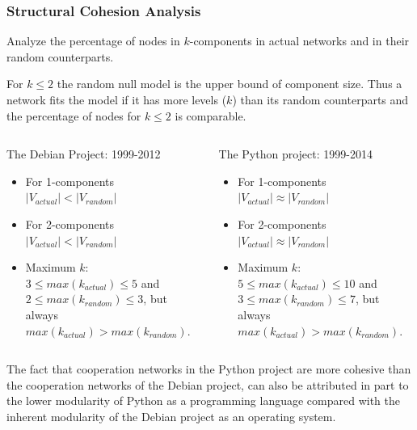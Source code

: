 \documentclass[ignorenonframetext,red,8pt,notes=hide]{beamer}
\begin{document}
\begin{frame}
\frametitle{Structural Cohesion Analysis}

Analyze the percentage of nodes in $k$-components in actual networks and in their random counterparts.

For $k \leq 2$ the random null model is the upper bound of component size. Thus a network fits the model if it has more levels ($k$) than its random counterparts and the percentage of nodes for $k \leq 2$ is comparable. 

\pause

\begin{columns}[c]
\begin{column}{0.5\textwidth}
\begin{block}{The Debian Project: 1999-2012}
\begin{itemize}
\item For 1-components $|V_{actual}| < |V_{random}|$
\item For 2-components $|V_{actual}| < |V_{random}|$
\item Maximum $k$:\\ $3 \leq max(k_{actual}) \leq 5$ and\\ $2 \leq  max(k_{random}) \leq 3$, but always \\ $max(k_{actual}) > max(k_{random})$. 
\end{itemize}
\end{block}
\end{column}

\begin{column}{0.5\textwidth}
\begin{block}{The Python project: 1999-2014}
\begin{itemize}
\item For 1-components $|V_{actual}| \approx |V_{random}|$
\item For 2-components $|V_{actual}| \approx |V_{random}|$
\item Maximum $k$:\\ $5 \leq max(k_{actual}) \leq 10$ and\\ $3 \leq  max(k_{random}) \leq 7$, but always\\ $max(k_{actual}) > max(k_{random})$. 
\end{itemize}
\end{block}
\end{column}
\end{columns}

\vspace{0.3cm}

The fact that cooperation networks in the Python project are more cohesive than the cooperation networks of the Debian project, can also be attributed in part to the lower modularity of Python as a programming language compared with the inherent modularity of the Debian project as an operating system.

\end{frame}
\end{document}
